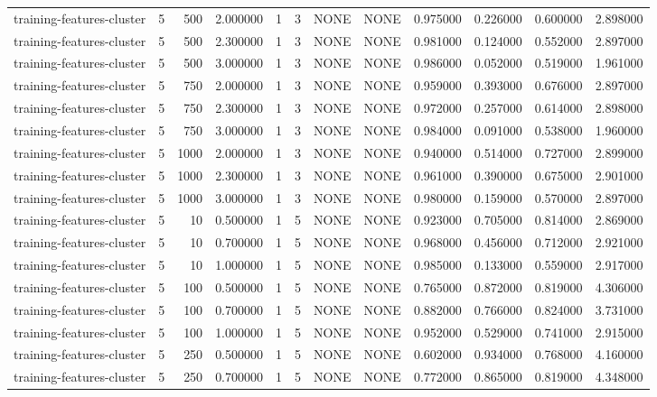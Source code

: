 \begin{tabular}{lrrrllllrrrr}
training-features-cluster & 5 & 500 & 2.000000 & 1 & 3 & NONE & NONE & 0.975000 & 0.226000 & 0.600000 & 2.898000 \\
training-features-cluster & 5 & 500 & 2.300000 & 1 & 3 & NONE & NONE & 0.981000 & 0.124000 & 0.552000 & 2.897000 \\
training-features-cluster & 5 & 500 & 3.000000 & 1 & 3 & NONE & NONE & 0.986000 & 0.052000 & 0.519000 & 1.961000 \\
training-features-cluster & 5 & 750 & 2.000000 & 1 & 3 & NONE & NONE & 0.959000 & 0.393000 & 0.676000 & 2.897000 \\
training-features-cluster & 5 & 750 & 2.300000 & 1 & 3 & NONE & NONE & 0.972000 & 0.257000 & 0.614000 & 2.898000 \\
training-features-cluster & 5 & 750 & 3.000000 & 1 & 3 & NONE & NONE & 0.984000 & 0.091000 & 0.538000 & 1.960000 \\
training-features-cluster & 5 & 1000 & 2.000000 & 1 & 3 & NONE & NONE & 0.940000 & 0.514000 & 0.727000 & 2.899000 \\
training-features-cluster & 5 & 1000 & 2.300000 & 1 & 3 & NONE & NONE & 0.961000 & 0.390000 & 0.675000 & 2.901000 \\
training-features-cluster & 5 & 1000 & 3.000000 & 1 & 3 & NONE & NONE & 0.980000 & 0.159000 & 0.570000 & 2.897000 \\
training-features-cluster & 5 & 10 & 0.500000 & 1 & 5 & NONE & NONE & 0.923000 & 0.705000 & 0.814000 & 2.869000 \\
training-features-cluster & 5 & 10 & 0.700000 & 1 & 5 & NONE & NONE & 0.968000 & 0.456000 & 0.712000 & 2.921000 \\
training-features-cluster & 5 & 10 & 1.000000 & 1 & 5 & NONE & NONE & 0.985000 & 0.133000 & 0.559000 & 2.917000 \\
training-features-cluster & 5 & 100 & 0.500000 & 1 & 5 & NONE & NONE & 0.765000 & 0.872000 & 0.819000 & 4.306000 \\
training-features-cluster & 5 & 100 & 0.700000 & 1 & 5 & NONE & NONE & 0.882000 & 0.766000 & 0.824000 & 3.731000 \\
training-features-cluster & 5 & 100 & 1.000000 & 1 & 5 & NONE & NONE & 0.952000 & 0.529000 & 0.741000 & 2.915000 \\
training-features-cluster & 5 & 250 & 0.500000 & 1 & 5 & NONE & NONE & 0.602000 & 0.934000 & 0.768000 & 4.160000 \\
training-features-cluster & 5 & 250 & 0.700000 & 1 & 5 & NONE & NONE & 0.772000 & 0.865000 & 0.819000 & 4.348000 \\

\end{tabular}
